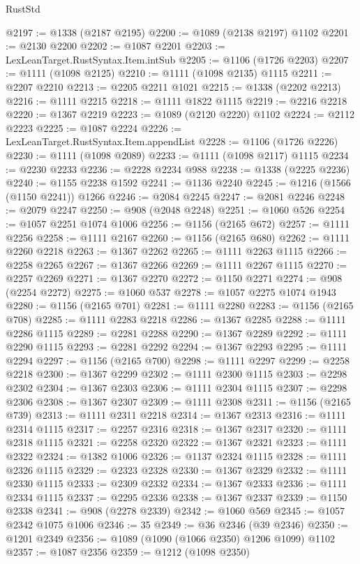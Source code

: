 \begin{lexlean}{RustStd}
\begin{coremodule}
@2197 := @1338 (@2187 @2195)
@2200 := @1089 (@2138 @2197) @1102
@2201 := @2130 @2200
@2202 := @1087 @2201
@2203 := LexLeanTarget.RustSyntax.Item.intSub
@2205 := @1106 (@1726 @2203)
@2207 := @1111 (@1098 @2125)
@2210 := @1111 (@1098 @2135) @1115
@2211 := @2207 @2210
@2213 := @2205 @2211 @1021
@2215 := @1338 (@2202 @2213)
@2216 := @1111 @2215
@2218 := @1111 @1822 @1115
@2219 := @2216 @2218
@2220 := @1367 @2219
@2223 := @1089 (@2120 @2220) @1102
@2224 := @2112 @2223
@2225 := @1087 @2224
@2226 := LexLeanTarget.RustSyntax.Item.appendList
@2228 := @1106 (@1726 @2226)
@2230 := @1111 (@1098 @2089)
@2233 := @1111 (@1098 @2117) @1115
@2234 := @2230 @2233
@2236 := @2228 @2234 @988
@2238 := @1338 (@2225 @2236)
@2240 := @1155 @2238 @1592
@2241 := @1136 @2240
@2245 := @1216 (@1566 (@1150 @2241)) @1266
@2246 := @2084 @2245
@2247 := @2081 @2246
@2248 := @2079 @2247
@2250 := @908 (@2048 @2248)
@2251 := @1060 @526
@2254 := @1057 @2251 @1074 @1006
@2256 := @1156 (@2165 @672)
@2257 := @1111 @2256
@2258 := @1111 @2167
@2260 := @1156 (@2165 @680)
@2262 := @1111 @2260 @2218
@2263 := @1367 @2262
@2265 := @1111 @2263 @1115
@2266 := @2258 @2265
@2267 := @1367 @2266
@2269 := @1111 @2267 @1115
@2270 := @2257 @2269
@2271 := @1367 @2270
@2272 := @1150 @2271
@2274 := @908 (@2254 @2272)
@2275 := @1060 @537
@2278 := @1057 @2275 @1074 @1943
@2280 := @1156 (@2165 @701)
@2281 := @1111 @2280
@2283 := @1156 (@2165 @708)
@2285 := @1111 @2283 @2218
@2286 := @1367 @2285
@2288 := @1111 @2286 @1115
@2289 := @2281 @2288
@2290 := @1367 @2289
@2292 := @1111 @2290 @1115
@2293 := @2281 @2292
@2294 := @1367 @2293
@2295 := @1111 @2294
@2297 := @1156 (@2165 @700)
@2298 := @1111 @2297
@2299 := @2258 @2218
@2300 := @1367 @2299
@2302 := @1111 @2300 @1115
@2303 := @2298 @2302
@2304 := @1367 @2303
@2306 := @1111 @2304 @1115
@2307 := @2298 @2306
@2308 := @1367 @2307
@2309 := @1111 @2308
@2311 := @1156 (@2165 @739)
@2313 := @1111 @2311 @2218
@2314 := @1367 @2313
@2316 := @1111 @2314 @1115
@2317 := @2257 @2316
@2318 := @1367 @2317
@2320 := @1111 @2318 @1115
@2321 := @2258 @2320
@2322 := @1367 @2321
@2323 := @1111 @2322
@2324 := @1382 @1006
@2326 := @1137 @2324 @1115
@2328 := @1111 @2326 @1115
@2329 := @2323 @2328
@2330 := @1367 @2329
@2332 := @1111 @2330 @1115
@2333 := @2309 @2332
@2334 := @1367 @2333
@2336 := @1111 @2334 @1115
@2337 := @2295 @2336
@2338 := @1367 @2337
@2339 := @1150 @2338
@2341 := @908 (@2278 @2339)
@2342 := @1060 @569
@2345 := @1057 @2342 @1075 @1006
@2346 := 35
@2349 := @36 @2346 (@39 @2346)
@2350 := @1201 @2349
@2356 := @1089 (@1090 (@1066 @2350) @1206 @1099) @1102
@2357 := @1087 @2356
@2359 := @1212 (@1098 @2350)

\end{coremodule}
\end{lexlean}
